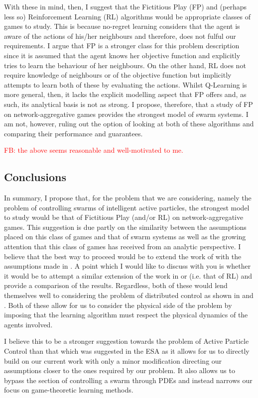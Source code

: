 \documentclass{article}
\newcommand{\fb}[1]{\textcolor{red}{FB: #1}}
\begin{document}
With these in mind, then, I suggest that the Fictitious Play (FP) and
(perhaps less so) Reinforcement Learning (RL) algorithms would be
appropriate classes of games to study. This is because no-regret
learning considers that the agent is aware of the actions of his/her
neighbours and therefore, does not fulful our requirements. I argue
that FP is a stronger class for this problem description since it is
assumed that the agent knows her objective function and explicitly
tries to learn the behaviour of her neighbours. On the other hand, RL
does not require knowledge of neighbours or of the objective function
but implicitly attempts to learn both of these by evaluating the
actions. Whilst Q-Learning is more general, then, it lacks the
explicit modelling aspect that FP offers and, as such, its analytical
basis is not as strong. I propose, therefore, that a study of FP on
network-aggregative games provides the strongest model of swarm
systems. I am not, however, ruling out the option of looking at both
of these algorithms and comparing their performance and guarantees.

\fb{the above seems reasonable and well-motivated to me.}

\subsection*{Conclusions} 

In summary, I propose that, for the problem that we are considering, namely the problem of
controlling swarms of intelligent active particles, the strongest model to study would be that of
Fictitious Play (and/or RL) on network-aggregative games. This suggestion is due partly on the
similarity between the assumptions placed on this class of games and that of swarm systems as well
as the growing attention that this class of games has received from an analytic perspective. I
believe that the best way to proceed would be to extend the work of \cite{Ewerhart2019} with the
assumptions made in \cite{Parise}. A point which I would like to discuss with you is whether it would
be to attempt a similar extension of the work in \cite{Li2017} or \cite{Vamvoudakis2017}
(i.e. that of RL) and provide a comparison of the results. Regardless, both of these would lend
themselves well to considering the problem of distributed control as shown in 
\cite{Vamvoudakis2017} and \cite{Bianchi, DePersis2020}. Both of these allow for us to
consider the physical side of the problem by imposing that the learning algorithm must respect the
physical dynamics of the agents involved. 

I believe this to be a stronger suggestion towards the problem of Active Particle Control than that
which was suggested in the ESA as it allows for us to directly build on our current work with only a
minor modification directing our assumptions closer to the ones required by our problem. It also
allows us to bypass the section of controlling a swarm through PDEs and instead narrows our focus on
game-theoretic learning methods. 

 


\end{document}
